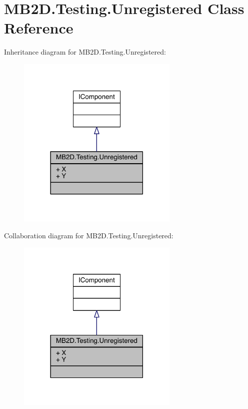 \hypertarget{class_m_b2_d_1_1_testing_1_1_unregistered}{}\section{M\+B2\+D.\+Testing.\+Unregistered Class Reference}
\label{class_m_b2_d_1_1_testing_1_1_unregistered}


Inheritance diagram for M\+B2\+D.\+Testing.\+Unregistered\+:
\nopagebreak
\begin{figure}[H]
\begin{center}
\leavevmode
\includegraphics[width=218pt]{class_m_b2_d_1_1_testing_1_1_unregistered__inherit__graph}
\end{center}
\end{figure}


Collaboration diagram for M\+B2\+D.\+Testing.\+Unregistered\+:
\nopagebreak
\begin{figure}[H]
\begin{center}
\leavevmode
\includegraphics[width=218pt]{class_m_b2_d_1_1_testing_1_1_unregistered__coll__graph}
\end{center}
\end{figure}

